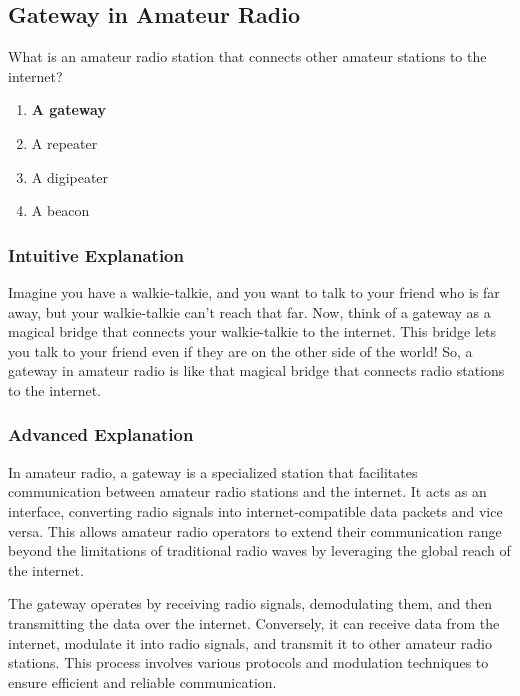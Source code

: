 \subsection{Gateway in Amateur Radio}
\label{T8C11}

\begin{tcolorbox}[colback=gray!10!white,colframe=black!75!black,title=T8C11]
What is an amateur radio station that connects other amateur stations to the internet?
\begin{enumerate}[label=\Alph*.]
    \item \textbf{A gateway}
    \item A repeater
    \item A digipeater
    \item A beacon
\end{enumerate}
\end{tcolorbox}

\subsubsection{Intuitive Explanation}
Imagine you have a walkie-talkie, and you want to talk to your friend who is far away, but your walkie-talkie can't reach that far. Now, think of a gateway as a magical bridge that connects your walkie-talkie to the internet. This bridge lets you talk to your friend even if they are on the other side of the world! So, a gateway in amateur radio is like that magical bridge that connects radio stations to the internet.

\subsubsection{Advanced Explanation}
In amateur radio, a gateway is a specialized station that facilitates communication between amateur radio stations and the internet. It acts as an interface, converting radio signals into internet-compatible data packets and vice versa. This allows amateur radio operators to extend their communication range beyond the limitations of traditional radio waves by leveraging the global reach of the internet.

The gateway operates by receiving radio signals, demodulating them, and then transmitting the data over the internet. Conversely, it can receive data from the internet, modulate it into radio signals, and transmit it to other amateur radio stations. This process involves various protocols and modulation techniques to ensure efficient and reliable communication.

